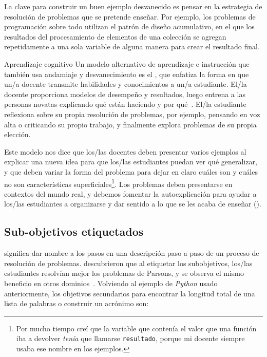 La clave para construir un buen ejemplo desvanecido es
pensar en la estrategia de resolución de problemas que se pretende enseñar.
Por ejemplo,
los problemas de programación sobre todo utilizan el patrón de diseño acumulativo,
en el que los resultados del procesamiento de elementos de una colección
se agregan repetidamente a una sola variable de alguna manera para crear el resultado final.


\begin{aside}{Aprendizaje cognitivo}
  Un modelo alternativo de aprendizaje e instrucción que también usa andamiaje y desvanecimiento
  es el ,
  que enfatiza la forma en que un/a docente transmite habilidades y conocimientos a un/a estudiante.
  El/la docente proporciona modelos de desempeño y resultados,
  luego entrena a las personas novatas explicando qué están haciendo y por qué~\cite{Coll1991,Casp2007}.
  El/la estudiante reflexiona sobre su propia resolución de problemas,
  por ejemplo, pensando en voz alta o criticando su propio trabajo,
  y finalmente explora problemas de su propia elección.

  Este modelo nos dice que
  los/las docentes deben presentar varios ejemplos al explicar una nueva idea
  para que los/las estudiantes puedan ver qué generalizar,
  y que deben variar la forma del problema para dejar en claro
  cuáles son y cuáles no son características superficiales\footnote{Por mucho tiempo
     creí que la variable que contenía el valor que una función iba a devolver
     \emph{tenía} que llamarse \texttt{resultado},
     porque mi docente siempre usaba ese nombre en los ejemplos.}.    
  Los problemas deben presentarse en contextos del mundo real,
  y debemos fomentar la autoexplicación para ayudar a los/las estudiantes
  a organizarse y dar sentido a lo que se les acaba de enseñar
 ().
\end{aside}


\subsection*{Sub-objetivos etiquetados}
 
 significa
dar nombre a los pasos en una descripción paso a paso de un proceso de resolución de problemas.
\cite{Marg2016,Morr2016} descubrieron que al etiquetar los sub\-objetivos, los/las estudiantes 
resolvían mejor los problemas de Parsons,
y se observa el mismo beneficio en otros dominios~\cite{Marg2012}.
Volviendo al ejemplo de \emph{Python} usado anteriormente,
los objetivos secundarios para encontrar la longitud total de una lista de palabras o construir un acrónimo son:

